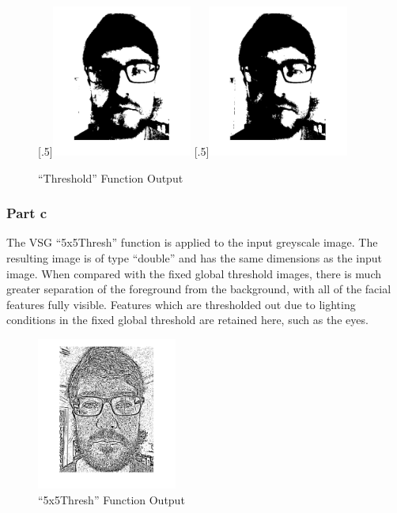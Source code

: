 \documentclass[a4paper]{article}
\begin{document}
	\begin{figure}[H]
		\centering
		[.5\linewidth]{\includegraphics[height=5cm]{Results/Q1/b/qbThresh130.jpg}}%
		[.5\linewidth]{\includegraphics[height=5cm]{Results/Q1/b/qbThresh140.jpg}}%
		\caption{``Threshold'' Function Output}
		\label{fig:}
	\end{figure}
	\subsubsection{Part c}
	The VSG ``5x5Thresh'' function is applied to the input greyscale image.
	The resulting image is of type ``double'' and has the same dimensions as
	the input image. When compared with the fixed global threshold images,
	there is much greater separation of the foreground from the background,
	with all of the facial features fully visible. Features which are
	thresholded out due to lighting conditions in the fixed global threshold
	are retained here, such as the eyes.
	\begin{figure}[H]
		\centering
		\includegraphics[height=5cm]{Results/Q1/c/qcThresh5x5.jpg}%
		\caption{``5x5Thresh'' Function Output}
		\label{fig:}
	\end{figure}
\end{document}

